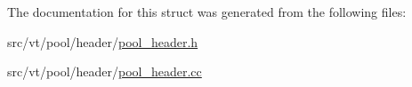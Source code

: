 The documentation for this struct was generated from the following files\+:\begin{DoxyCompactItemize}
\item 
src/vt/pool/header/\hyperlink{pool__header_8h}{pool\+\_\+header.\+h}\item 
src/vt/pool/header/\hyperlink{pool__header_8cc}{pool\+\_\+header.\+cc}\end{DoxyCompactItemize}
